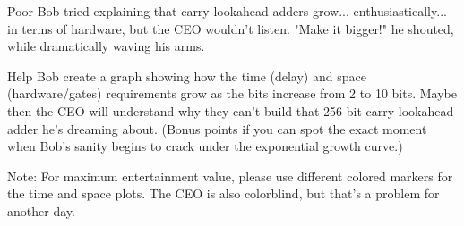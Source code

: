\documentclass[12pt]{labmanual}
\begin{document}
Poor Bob tried explaining that carry lookahead adders grow... enthusiastically... in terms of hardware, but the CEO wouldn't listen. "Make it bigger!" he shouted, while dramatically waving his arms.

Help Bob create a graph showing how the time (delay) and space (hardware/gates) requirements grow as the bits increase from 2 to 10 bits. Maybe then the CEO will understand why they can't build that 256-bit carry lookahead adder he's dreaming about. (Bonus points if you can spot the exact moment when Bob's sanity begins to crack under the exponential growth curve.)

Note: For maximum entertainment value, please use different colored markers for the time and space plots. The CEO is also colorblind, but that's a problem for another day.
\end{document}
